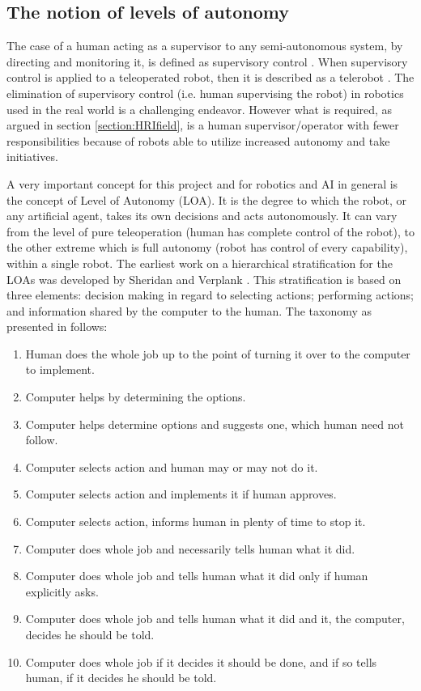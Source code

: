 \documentclass[a4paper,12pt,oneside,openright]{bhamthesis}
\begin{document}
\subsection{The notion of levels of autonomy}
The case of a human acting as a supervisor to any semi-autonomous system, by directing and monitoring it, is defined as supervisory control \cite{Sheridan1989}. When supervisory control is applied to a teleoperated robot, then it is described as a telerobot \cite{Sheridan1995}. The elimination of supervisory control (i.e. human supervising the robot) in robotics used in the real world is a challenging endeavor. However what is required, as argued in section \ref{section:HRIfield}, is a human supervisor/operator with fewer responsibilities because of robots able to utilize increased autonomy and take initiatives.  

A very important concept for this project and for robotics and AI in general is the concept of Level of Autonomy (LOA). It is the degree to which the robot, or any artificial agent, takes its own decisions and acts autonomously. It can vary from the level of pure teleoperation (human has complete control of the robot), to the other extreme which is full autonomy (robot has control of every capability), within a single robot. The earliest work on a hierarchical stratification for the LOAs was developed by Sheridan and Verplank \cite{Sheridan1978}. This stratification is based on three elements: decision making in regard to selecting actions; performing actions; and information shared by the computer to the human. The taxonomy as presented in \cite{Sheridan1978} follows:

\begin{enumerate}
	\item Human does the whole job up to the point of turning it over to the computer to implement.
	\item Computer helps by determining the options.
	\item Computer helps determine options and suggests one, which human need not follow.
	\item Computer selects action and human may or may not do it.
	\item Computer selects action and implements it if human approves.
	\item Computer selects action, informs human in plenty of time to stop it.
	\item Computer does whole job and necessarily tells human what it did.
	\item Computer does whole job and tells human what it did only if human explicitly asks.
	\item Computer does whole job and tells human what it did and it, the computer, decides he should be told.
	\item Computer does whole job if it decides it should be done, and if so tells human, if it decides he should be told.	
\end{enumerate}
\end{document}
